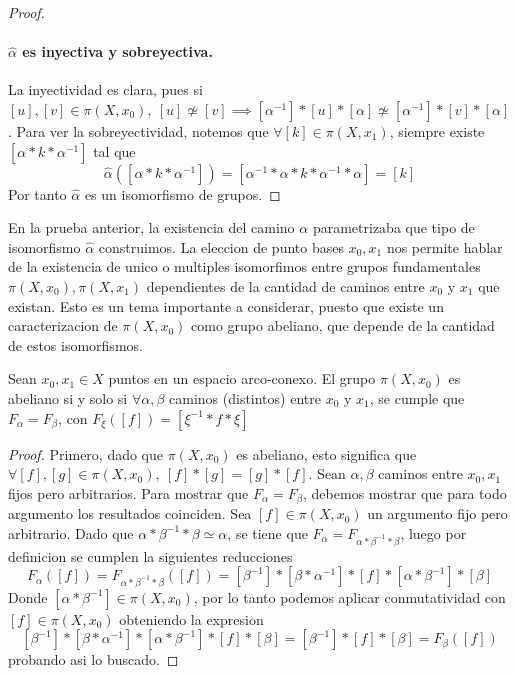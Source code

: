 {\begin{proof}
  \paragraph{\(\hat \alpha\) es inyectiva y sobreyectiva.} La inyectividad es
  clara, pues si \([u],[v] \in \pi (X, x_0),\ [u] \not \simeq [v]
  \implies [\alpha^{-1}] * [u] * [\alpha] \not \simeq [\alpha^{-1}] * [v]
  * [\alpha]\). Para ver la sobreyectividad, notemos que \(\forall [k] \in
  \pi (X, x_1) \), siempre existe \( [\alpha * k * \alpha^{-1}]\) tal
  que
  \[ \hat \alpha ([\alpha * k * \alpha^{-1}]) = [\alpha^{-1} * \alpha * k *
    \alpha^{-1} * \alpha] = [k]\]
  Por tanto \(\hat \alpha\) es un isomorfismo de grupos.
\end{proof}
En la prueba anterior, la existencia del camino \(\alpha\)
parametrizaba que tipo de isomorfismo \(\hat \alpha\) construimos.
La eleccion de punto bases
\(x_0, x_1\) nos permite hablar de la existencia de unico o multiples
isomorfimos entre grupos fundamentales \(\pi (X, x_0), \pi (X, x_1) \)
dependientes de la cantidad de caminos entre \(x_0\) y \(x_1\) que
existan. Esto es un tema importante a considerar, puesto que existe un
caracterizacion de \(\pi (X, x_0) \) como grupo abeliano, que depende de
la cantidad de estos isomorfismos.
\begin{teorema}
  Sean \(x_0, x_1 \in X\) puntos en un espacio arco-conexo. El grupo
  \(\pi (X, x_0) \) es abeliano si y solo si \(\forall \alpha, \beta\)
  caminos (distintos) entre \(x_0\) y \(x_1\), se cumple que \(F_\alpha =
  F_\beta\), con \(F_{\xi} ([f]) = [\xi^{-1} * f * \xi] \)
\end{teorema}
\begin{proof}
  Primero, dado que \(\pi (X, x_0)\) es
  abeliano, esto significa que \(\forall [f],[g] \in \pi (X, x_0),\ [f]
  * [g] = [g] * [f]\). Sean \(\alpha, \beta\) caminos entre \(x_0,x_1\)
  fijos pero arbitrarios. Para mostrar que \(F_\alpha = F_\beta\),
  debemos mostrar que para todo argumento los resultados coinciden. Sea
  \([f] \in \pi (X, x_0) \) un argumento fijo pero arbitrario. Dado que
  \(\alpha * \beta^{-1} * \beta \simeq \alpha \), se tiene que
  \(F_\alpha = F _{\alpha * \beta^{-1} * \beta}\), luego por definicion
  se cumplen la siguientes reducciones
  \[ F_\alpha ([f]) = F_{\alpha * \beta^{-1} * \beta} ([f]) =
    [\beta^{-1}] * [\beta * \alpha^{-1}] * [f] * [\alpha * \beta^{-1}]
    * [\beta] \]
  Donde \([\alpha * \beta^{-1}] \in \pi (X, x_0) \), por lo tanto podemos
  aplicar conmutatividad con \([f] \in \pi (X,x_0)\) obteniendo la expresion
  \[ [\beta^{-1}] * [\beta * \alpha^{-1}] * [\alpha * \beta^{-1}] * [f]
    * [\beta] = [\beta^{-1}] * [f] * [\beta] = F_\beta ([f]) \]
  probando asi lo buscado.


\end{proof}}

